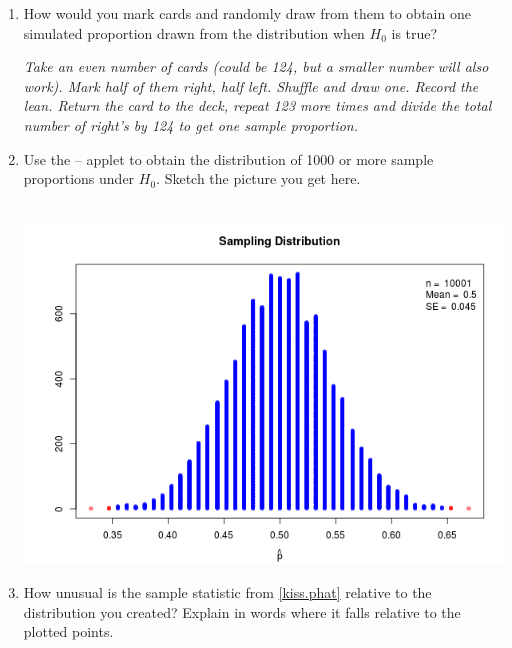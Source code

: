\begin{enumerate}
\begin{enumerate}
\begin{enumerate}
\begin{key} 
{\it $p = .5$.  Half of all couples lean right when kissing.}
\end{key}
$H_a:$
\begin{students}
    \vspace{1cm}    \\
\end{students}
\begin{key} 
{\it $p \neq .5$.  The true proportion of couples leaning right when
  kissing is not one half.}
\end{key}
    \item How would you mark cards and randomly draw from them to
      obtain one simulated proportion drawn from the distribution when
      $H_0$ is true?
\begin{students}
    \vspace{3cm}    
\end{students}
\begin{key} 
{\it Take an even number of cards (could be 124, but a
    smaller number will also work). Mark half of them right, half
    left. Shuffle and draw one. Record the lean. Return the card
    to the deck, repeat 123 more times and divide the total number of
    right's by 124 to get one sample proportion.}
\end{key}
    \item Use the   --  applet to obtain
      the distribution of 1000 or more sample proportions under $H_0$.
      Sketch the picture you get here.
\begin{students}
    \vspace{5cm}    
\end{students}
\begin{key}
\ \  \\ \includegraphics[width=.3\linewidth]{plots/kissing-null.png}
\end{key}
  \item How unusual is the sample statistic from \ref{kiss.phat}
    relative to the distribution you created?  Explain in words where
    it falls relative to the plotted points.
\begin{students}
    \vspace{3cm}    
\end{students}


\end{enumerate}
\end{enumerate}
\end{enumerate}
